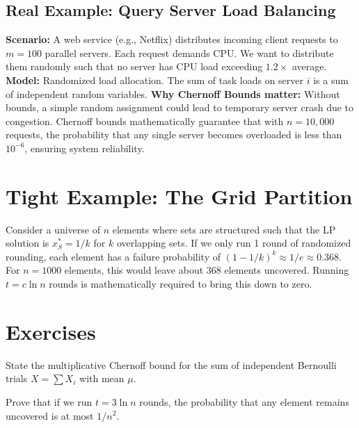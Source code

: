 \subsection*{Real Example: Query Server Load Balancing}
\textbf{Scenario:} A web service (e.g., Netflix) distributes incoming client requests to $m = 100$ parallel servers. Each request demands CPU. We want to distribute them randomly such that no server has CPU load exceeding $1.2 \times$ average.
\textbf{Model:} Randomized load allocation. The sum of task loads on server $i$ is a sum of independent random variables.
\textbf{Why Chernoff Bounds matter:} Without bounds, a simple random assignment could lead to temporary server crash due to congestion. Chernoff bounds mathematically guarantee that with $n = 10,000$ requests, the probability that any single server becomes overloaded is less than $10^{-6}$, ensuring system reliability.

\section{Tight Example: The Grid Partition}
Consider a universe of $n$ elements where sets are structured such that the LP solution is $x_S^* = 1/k$ for $k$ overlapping sets. If we only run 1 round of randomized rounding, each element has a failure probability of $(1-1/k)^k \approx 1/e \approx 0.368$. For $n = 1000$ elements, this would leave about 368 elements uncovered. Running $t = c \ln n$ rounds is mathematically required to bring this down to zero.

\section{Exercises}
\begin{exercise}
State the multiplicative Chernoff bound for the sum of independent Bernoulli trials $X = \sum X_i$ with mean $\mu$.
\end{exercise}
\begin{exercise}
Prove that if we run $t = 3 \ln n$ rounds, the probability that any element remains uncovered is at most $1/n^2$.
\end{exercise}

